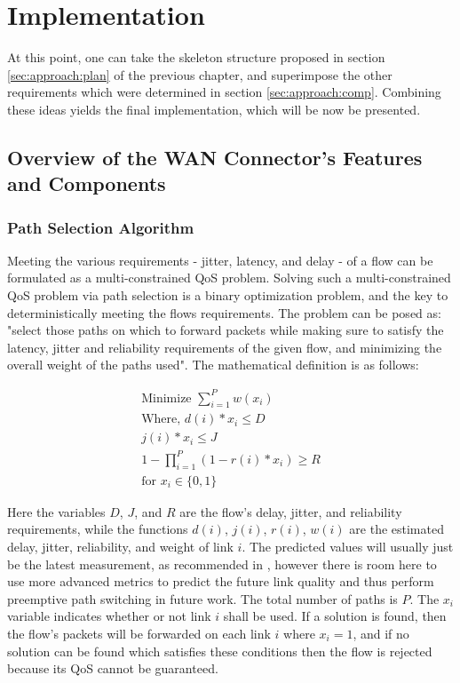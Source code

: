 \chapter{Implementation}
\label{cha:impl}

At this point, one can take the skeleton structure proposed in section \ref{sec:approach:plan} of the previous chapter, and superimpose the other requirements which were determined in section \ref{sec:approach:comp}. Combining these ideas yields the final implementation, which will be now be presented.


\section{Overview of the WAN Connector's Features and Components}
\label{sec:approach:arch}

\subsection{Path Selection Algorithm}

Meeting the various requirements - jitter, latency, and delay - of a flow can be formulated as a multi-constrained QoS problem. Solving such a multi-constrained QoS problem via path selection is a binary optimization problem, and the key to deterministically meeting the flows requirements. The problem can be posed as: "select those paths on which to forward packets while making sure to satisfy the latency, jitter and reliability requirements of the given flow, and minimizing the overall weight of the paths used". The mathematical definition is as follows:

\begin{gather}
\label{algorithm}
\text{Minimize } \sum_{i=1}^{P}w(x_i) \\
\text{Where,   } d(i) * x_i\le D \\
j(i) * x_i \le J \\
1 - \prod_{i=1}^{P}{ ( 1- r(i) * x_i ) } \ge R  \\
\text{for } x_i \in \{0,1\}
\end{gather}

Here the variables $D$, $J$, and $R$ are the flow's delay, jitter, and reliability requirements, while the functions $d(i)$, $j(i)$, $r(i)$, $w(i)$ are the estimated delay, jitter, reliability, and weight of link $i$. The predicted values will usually just be the latest measurement, as recommended in \cite{akella2008performance}, however there is room here to use more advanced metrics to predict the future link quality and thus perform preemptive path switching in future work. The total number of paths is $P$. The $x_i$ variable indicates whether or not link $i$ shall be used. If a solution is found, then the flow's packets will be forwarded on each link $i$ where $x_i = 1$, and if no solution can be found which satisfies these conditions then the flow is rejected because its QoS cannot be guaranteed.

